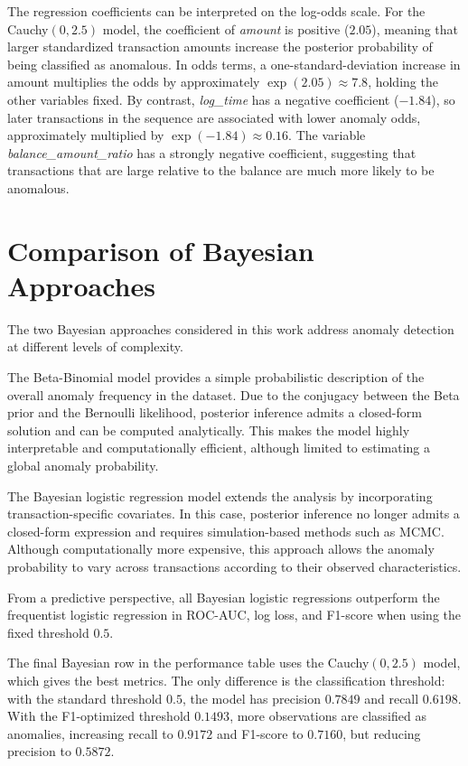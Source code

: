 \documentclass[a4paper,12pt]{article}
\begin{document}
The regression coefficients can be interpreted on the log-odds scale. For the Cauchy$(0,2.5)$ model, the coefficient of \textit{amount} is positive ($2.05$), meaning that larger standardized transaction amounts increase the posterior probability of being classified as anomalous. In odds terms, a one-standard-deviation increase in amount multiplies the odds by approximately $\exp(2.05) \approx 7.8$, holding the other variables fixed. By contrast, \textit{log\_time} has a negative coefficient ($-1.84$), so later transactions in the sequence are associated with lower anomaly odds, approximately multiplied by $\exp(-1.84) \approx 0.16$. The variable \textit{balance\_amount\_ratio} has a strongly negative coefficient, suggesting that transactions that are large relative to the balance are much more likely to be anomalous.

\section{Comparison of Bayesian Approaches}

The two Bayesian approaches considered in this work address anomaly detection at different levels of complexity.

The Beta-Binomial model provides a simple probabilistic description of the overall anomaly frequency in the dataset. Due to the conjugacy between the Beta prior and the Bernoulli likelihood, posterior inference admits a closed-form solution and can be computed analytically. This makes the model highly interpretable and computationally efficient, although limited to estimating a global anomaly probability.

The Bayesian logistic regression model extends the analysis by incorporating transaction-specific covariates. In this case, posterior inference no longer admits a closed-form expression and requires simulation-based methods such as MCMC. Although computationally more expensive, this approach allows the anomaly probability to vary across transactions according to their observed characteristics.

From a predictive perspective, all Bayesian logistic regressions outperform the frequentist logistic regression in ROC-AUC, log loss, and F1-score when using the fixed threshold $0.5$.

The final Bayesian row in the performance table uses the Cauchy$(0,2.5)$ model, which gives the best metrics. The only difference is the classification threshold: with the standard threshold $0.5$, the model has precision $0.7849$ and recall $0.6198$. With the F1-optimized threshold $0.1493$, more observations are classified as anomalies, increasing recall to $0.9172$ and F1-score to $0.7160$, but reducing precision to $0.5872$.
\end{document}
